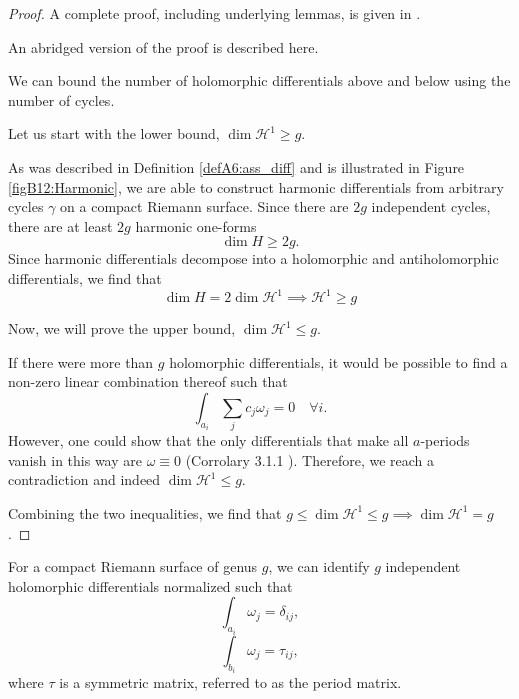 \begin{proof}
    A complete proof, including underlying lemmas, is given in \cite{Ber06}.

    An abridged version of the proof is described here.

    We can bound the number of holomorphic differentials above and below using the number of cycles.

    Let us start with the lower bound, $\dim \mathcal H^1 \geq g$.

    As was described in Definition \ref{defA6:ass_diff} and is illustrated in Figure \ref{figB12:Harmonic}, we are able to construct harmonic differentials from arbitrary cycles $\gamma$ on a compact Riemann surface. Since there are $2g$ independent cycles, there are at least $2g$ harmonic one-forms
    \begin{equation}
        \dim H \geq 2g.
    \end{equation}
    Since harmonic differentials decompose into a holomorphic and antiholomorphic differentials, we find that
    \begin{equation}
        \dim H = 2 \dim \mathcal H^1 \implies \mathcal H^1 \geq g
    \end{equation}

    Now, we will prove the upper bound, $\dim \mathcal H^1 \leq g$.

    If there were more than $g$ holomorphic differentials, it would be possible to find a non-zero linear combination thereof such that
    \begin{equation}
        \int_{a_i} \sum_j c_j \omega_j = 0 \quad \forall i.
    \end{equation}
    However, one could show that the only differentials that make all $a$-periods vanish in this way are $\omega \equiv 0$ (Corrolary 3.1.1 \cite{Ber06}). Therefore, we reach a contradiction and indeed $\dim \mathcal H^1 \leq g$. 

    Combining the two inequalities, we find that $g \leq \dim \mathcal H^1 \leq g \implies \dim \mathcal H^1 = g$.
\end{proof}

\begin{lemma}
    For a compact Riemann surface of genus $g$, we can identify $g$ independent holomorphic differentials normalized such that
    \begin{equation}
        \int_{a_i} \omega_j = \delta_{ij},
    \end{equation}
    \begin{equation}
        \int_{b_i} \omega_j = \tau_{ij},
    \end{equation}
    where $\tau$ is a symmetric matrix, referred to as the period matrix.
\end{lemma}

